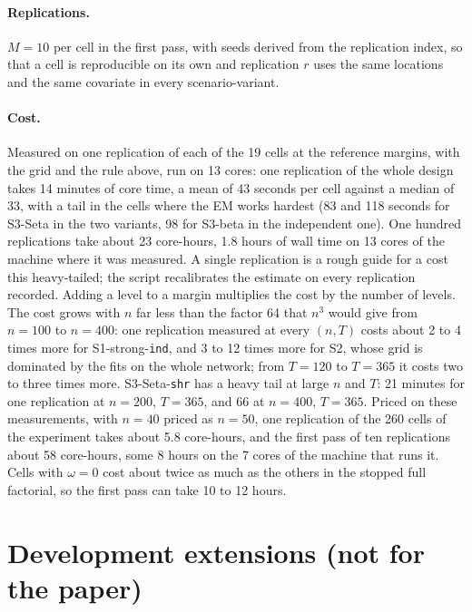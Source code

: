 \documentclass[11pt]{article}
\begin{document}
\paragraph{Replications.} $M = 10$ per cell in the first pass, with seeds derived from the replication index, so that a cell is reproducible on its own and replication $r$ uses the same locations and the same covariate in every scenario-variant.

\paragraph{Cost.} Measured on one replication of each of the 19 cells at the reference margins, with the grid and the rule above, run on 13 cores: one replication of the whole design takes 14 minutes of core time, a mean of 43 seconds per cell against a median of 33, with a tail in the cells where the EM works hardest (83 and 118 seconds for S3-Seta in the two variants, 98 for S3-beta in the independent one). One hundred replications take about 23 core-hours, 1.8 hours of wall time on 13 cores of the machine where it was measured. A single replication is a rough guide for a cost this heavy-tailed; the script recalibrates the estimate on every replication recorded. Adding a level to a margin multiplies the cost by the number of levels. The cost grows with $n$ far less than the factor 64 that $n^3$ would give from $n = 100$ to $n = 400$: one replication measured at every $(n, T)$ costs about 2 to 4 times more for S1-strong-\texttt{ind}, and 3 to 12 times more for S2, whose grid is dominated by the fits on the whole network; from $T = 120$ to $T = 365$ it costs two to three times more. S3-Seta-\texttt{shr} has a heavy tail at large $n$ and $T$: 21 minutes for one replication at $n = 200$, $T = 365$, and 66 at $n = 400$, $T = 365$. Priced on these measurements, with $n = 40$ priced as $n = 50$, one replication of the 260 cells of the experiment takes about 5.8 core-hours, and the first pass of ten replications about 58 core-hours, some 8 hours on the 7 cores of the machine that runs it. Cells with $\omega = 0$ cost about twice as much as the others in the stopped full factorial, so the first pass can take 10 to 12 hours.

\section{Development extensions (not for the paper)}\label{sec:dev}
\end{document}
